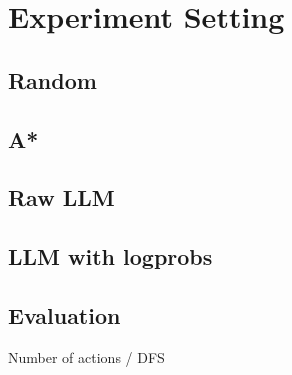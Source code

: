 \chapter{Experiment Setting}
\label{cha:examples}

\section{Random}
\lipsum[1]

\section{A*}
\lipsum[1]
\section{Raw LLM}
\lipsum[1]
\section{LLM with logprobs}
\lipsum[1]

\section{Evaluation}
Number of actions / DFS